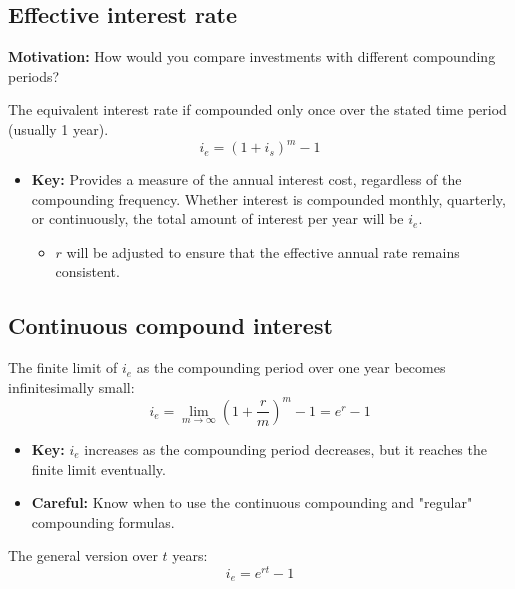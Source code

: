 \subsection{Effective interest rate}
\textbf{Motivation:} How would you compare investments with different compounding periods?
\begin{definition}
    The equivalent interest rate if compounded only once over the stated time period (usually 1 year).
    \begin{equation}
        i_e = (1 + i_s)^m - 1
    \end{equation}
    \begin{itemize}
        \item \textbf{Key:} Provides a measure of the annual interest cost, regardless of the compounding frequency. Whether interest is compounded monthly, quarterly, or continuously, the total amount of interest per year will be $i_e$. 
        \begin{itemize}
            \item $r$ will be adjusted to ensure that the effective annual rate remains consistent. 
        \end{itemize}
    \end{itemize}
\end{definition}


\subsection{Continuous compound interest}
\begin{definition}
    The finite limit of \(i_e\) as the compounding period over one year becomes infinitesimally small:
    \begin{equation}
        i_e = \lim_{m \to \infty} \left(1 + \frac{r}{m}\right)^m - 1 = e^r - 1
    \end{equation}
    \begin{itemize}
        \item \textbf{Key:} \(i_e\) increases as the compounding period decreases, but it reaches the finite limit eventually.
        \item \textbf{Careful:} Know when to use the continuous compounding and "regular" compounding formulas. 
    \end{itemize}
    \vspace{1em}
    
    The general version over $t$ years:
    \begin{equation}
        i_e = e^{rt} - 1
    \end{equation}
\end{definition}

